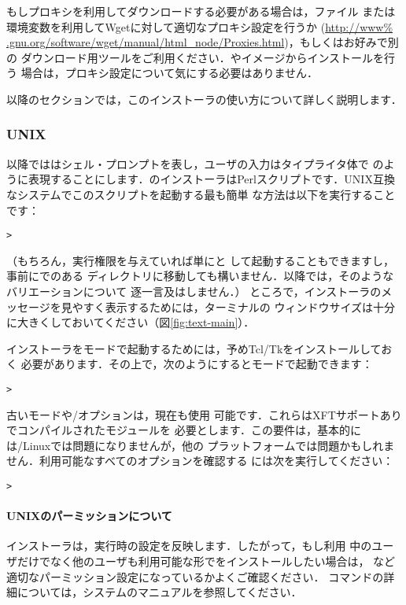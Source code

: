 \documentclass[uplatex,dvipdfmx]{jsarticle}
\begin{document}
もしプロキシを利用してダウンロードする必要がある場合は，ファイル
または環境変数を利用してWgetに対して適切なプロキシ設定を行うか (\url{http://www%
.gnu.org/software/wget/manual/html_node/Proxies.html})，もしくはお好みで別の
ダウンロード用ツールをご利用ください．\DVD や\ISO イメージからインストールを行う
場合は，プロキシ設定について気にする必要はありません．

以降のセクションでは，このインストーラの使い方について詳しく説明します．

\subsubsection{UNIX}

以降では\code{>}はシェル・プロンプトを表し，ユーザの入力はタイプライタ体で
のように表現することにします．\TL のインストーラはPerlスクリプトです．UNIX互換なシステムでこのスクリプトを起動する最も簡単
な方法は以下を実行することです：
%
\begin{alltt}
> 
\end{alltt}
%
（もちろん，実行権限を与えていれば単にと
して起動することもできますし，事前にでのある
ディレクトリに移動しても構いません．以降では，そのようなバリエーションについて
逐一言及はしません．）
%
ところで，インストーラのメッセージを見やすく表示するためには，ターミナルの
ウィンドウサイズは十分に大きくしておいてください（図\ref{fig:text-main}）．

インストーラを\GUI モードで起動するためには，予めTcl/Tkをインストールしておく
必要があります．その上で，次のようにすると\GUI モードで起動できます：
%
\begin{alltt}
> 
\end{alltt}

古いモードや/オプションは，現在も使用
可能です．これらはXFTサポートありでコンパイルされたモジュールを
必要とします．この要件は，基本的には\GNU/Linuxでは問題になりませんが，他の
プラットフォームでは問題かもしれません．利用可能なすべてのオプションを確認する
には次を実行してください：
%
\begin{alltt}
> 
\end{alltt}

\paragraph{UNIXのパーミッションについて}
\TL インストーラは，実行時の設定を反映します．したがって，もし利用
中のユーザだけでなく他のユーザも利用可能な形で\TL をインストールしたい場合は，
など適切なパーミッション設定になっているかよくご確認ください．
コマンドの詳細については，システムのマニュアルを参照してください．
\end{document}

